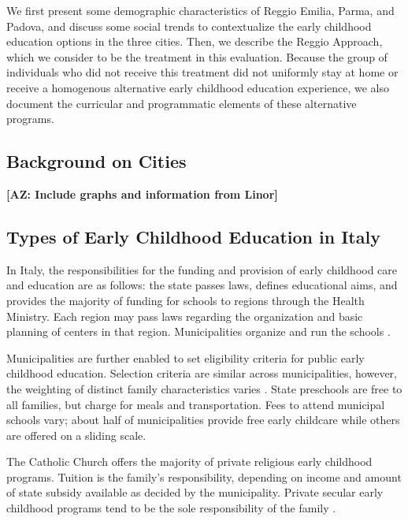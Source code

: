 We first present some demographic characteristics of Reggio Emilia, Parma, and Padova, and discuss some social trends to contextualize the early childhood education options in the three cities. Then, we describe the Reggio Approach, which we consider to be the treatment in this evaluation. Because the group of individuals who did not receive this treatment did not uniformly stay at home or receive a homogenous alternative early childhood education experience, we also document the curricular and programmatic elements of these alternative programs.

\subsection{Background on Cities}
\label{sec:backgroundcities}

\textbf{[AZ: Include graphs and information from Linor]}

\subsection{Types of Early Childhood Education in Italy}

In Italy, the responsibilities for the funding and provision of early childhood care and education are as follows: the state passes laws, defines educational aims, and provides the majority of funding for schools to regions through the Health Ministry. Each region may pass laws regarding the organization and basic planning of centers in that region. Municipalities organize and run the schools \citep{Becchi-Ferrari_1990_Pub-Inf-Centres-Italy}. 

Municipalities are further enabled to set eligibility criteria for public early childhood education. Selection criteria are similar across municipalities, however, the weighting of distinct family characteristics varies \citep{Del-Boca-etal_2016_CESifo-ES}. State preschools are free to all families, but charge for meals and transportation. Fees to attend municipal schools vary; about half of municipalities provide free early childcare while others are offered on a sliding scale.

The Catholic Church offers the majority of private religious early childhood programs. Tuition is the family's responsibility, depending on income and amount of state subsidy available as decided by the municipality. Private secular early childhood programs tend to be the sole responsibility of the family \citep{Hohnerlein_2009_Paradox-Public-Preschools}.

